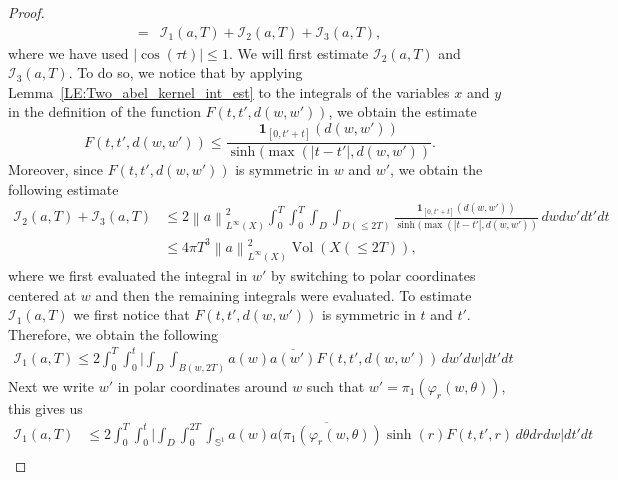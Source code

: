 \documentclass[10pt,a4paper]{amsart}
\newcommand{\norm}[1]{\left\lVert#1\right\rVert}
\DeclareMathOperator{\vol}{Vol}
\begin{document}
\begin{proof}
\begin{equation}
\begin{aligned}
         ={}& \mathcal{I}_1(a,T) +\mathcal{I}_2(a,T)+\mathcal{I}_3(a,T),
    \end{aligned}
\end{equation}
where we have used $|\cos(\tau t)|\leq 1$. We will first estimate $\mathcal{I}_2(a,T)$ and $\mathcal{I}_3(a,T)$. To do so, we notice that by applying Lemma~\ref{LE:Two_abel_kernel_int_est} to the integrals of the variables $x$ and $y$ in the definition of the function $ F(t,t',d(w,w'))$, we obtain the estimate 
\begin{equation}\label{EQ:free_HS_est_exponential_mixing_4}
    F(t,t',d(w,w')) \leq  \frac{\boldsymbol{1}_{[0,t'+t]}(d(w,w'))}{\sinh(\max(|t-t'|,d(w,w'))}.
\end{equation}
Moreover, since $ F(t,t',d(w,w'))$ is symmetric in $w$ and $w'$, we obtain the following estimate
\begin{equation}\label{EQ:free_HS_est_exponential_mixing_5}
    \begin{aligned}
        \mathcal{I}_2(a,T)+\mathcal{I}_3(a,T)
        &\leq 
         2\norm{a}^2_{L^\infty(X)}\int_0^T\int_0^T \int_{D} \int_{D( \leq 2T)} \frac{\boldsymbol{1}_{[0,t'+t]}(d(w,w'))}{\sinh(\max(|t-t'|,d(w,w'))}   \, d w  d w'   d t'd t 
         \\
         &\leq 4\pi T^3\norm{a}^2_{L^\infty(X)} \vol(X(\leq 2T)),
    \end{aligned}
\end{equation}
where we first evaluated the integral in $w'$ by switching to polar coordinates centered at $w$ and then the remaining integrals were evaluated. 
To estimate $\mathcal{I}_1(a,T)$ we first notice that $F(t,t',d(w,w'))$ is symmetric in $t$ and $t'$. Therefore, we obtain the following
\begin{equation*}
    \begin{aligned}
        \mathcal{I}_1(a,T)
        \leq 2  \int_0^T\int_0^t \Big| \int_{D}  \int_{B(w,2T) } a(w) \overline{a(w')}  F(t,t',d(w,w'))  \,d w' d w   \Big|   d t'd t
    \end{aligned}
\end{equation*}
Next we write $w'$ in polar coordinates around $w$ such that $w' = \pi_1(\varphi_r(w,\theta))$, this gives us 
\begin{equation*}
    \begin{aligned}
        \mathcal{I}_1(a,T)
        &\leq 2  \int_0^T\int_0^t \Big| \int_{D} \int_{0}^{2T}  \int_{\mathbb{S}^1 } a(w) \overline{a(\pi_1(\varphi_r(w,\theta))}  \sinh(r) F(t,t',r)  \,d \theta d r d w   \Big|   d t'd t
        \\

\end{aligned}
\end{equation*}
\end{proof}
\end{document}

